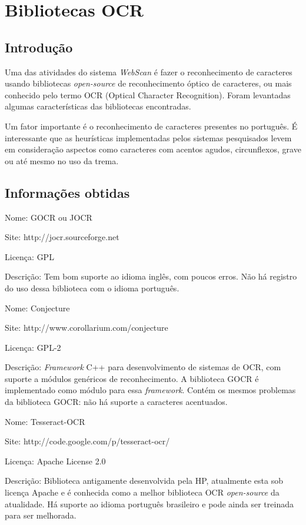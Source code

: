 \section{Bibliotecas OCR}
\label{sec:pesquisa_ocr}

\subsection{Introdução}
Uma das atividades do sistema {\it WebScan} é fazer o reconhecimento de caracteres usando bibliotecas {\it open-source} de reconhecimento óptico de caracteres, ou mais conhecido pelo termo OCR (Optical Character Recognition). Foram levantadas algumas características das bibliotecas encontradas.

Um fator importante é o reconhecimento de caracteres presentes no português. É interessante que as heurísticas implementadas pelos sistemas pesquisados levem em consideração aspectos como caracteres com acentos agudos, circunflexos, grave ou até mesmo no uso da trema.

\subsection{Informações obtidas}
\label{sec:libs_ocr}

\begin{description*}
    \item[Nome:] GOCR ou JOCR
    \item[Site:] http://jocr.sourceforge.net
    \item[Licença:] GPL
    \item[Descrição:] Tem bom suporte ao idioma inglês, com poucos erros. Não há registro do uso dessa biblioteca com o idioma português.
\end{description*}

\begin{description*}
    \item[Nome:] Conjecture
    \item[Site:] http://www.corollarium.com/conjecture
    \item[Licença:] GPL-2
    \item[Descrição:] {\it Framework} C++ para desenvolvimento de sistemas de OCR, com suporte a módulos genéricos de reconhecimento. A biblioteca GOCR é implementado como módulo para essa {\it framework}. Contém os mesmos problemas da biblioteca GOCR: não há suporte a caracteres acentuados.
\end{description*}

\begin{description*}
    \item[Nome:] Tesseract-OCR
    \item[Site:] http://code.google.com/p/tesseract-ocr/
    \item[Licença:] Apache License 2.0
    \item[Descrição:] Biblioteca antigamente desenvolvida pela HP, atualmente esta sob licença Apache e é conhecida como a melhor biblioteca OCR {\it open-source} da atualidade. Há suporte ao idioma português brasileiro e pode ainda ser treinada para ser melhorada.
\end{description*}



